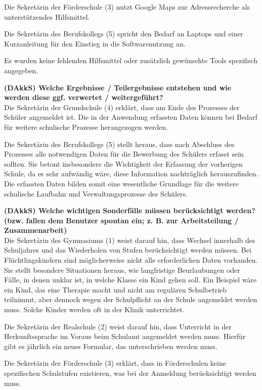 Die Sekretärin der Förderschule (3) nutzt Google Maps zur Adressrecherche als unterstützendes Hilfsmittel.

Die Sekretärin des Berufskollegs (5) spricht den Bedarf an Laptops und einer Kurzanleitung für den Einstieg in die Softwarenutzung an.

Es wurden keine fehlenden Hilfsmittel oder zusätzlich gewünschte Tools spezifisch angegeben.

\textbf{(DAkkS) Welche Ergebnisse / Teilergebnisse entstehen und wie werden diese ggf. verwertet / weitergeführt?}\\
Die Sekretärin der Grundschule (4) erklärt, dass am Ende des Prozesses der Schüler angemeldet ist. Die in der Anwendung erfassten Daten können bei Bedarf für weitere schulische Prozesse herangezogen werden.

Die Sekretärin des Berufskollegs (5) stellt heraus, dass nach Abschluss des Prozesses alle notwendigen Daten für die Bewerbung des Schülers erfasst sein sollten. Sie betont insbesondere die Wichtigkeit der Erfassung der vorherigen Schule, da es sehr aufwändig wäre, diese Information nachträglich herauszufinden. Die erfassten Daten bilden somit eine wesentliche Grundlage für die weitere schulische Laufbahn und Verwaltungsprozesse des Schülers.

\textbf{(DAkkS) Welche wichtigen Sonderfälle müssen berücksichtigt werden? (bzw. fallen dem Benutzer spontan ein; z. B. zur Arbeitsteilung / Zusammenarbeit)}\\
Die Sekretärin des Gymnasiums (1) weist darauf hin, dass Wechsel innerhalb des Schuljahres und das Wiederholen von Stufen berücksichtigt werden müssen. Bei Flüchtlingskindern sind möglicherweise nicht alle erforderlichen Daten vorhanden. Sie stellt besondere Situationen heraus, wie langfristige Beurlaubungen oder Fälle, in denen unklar ist, in welche Klasse ein Kind gehen soll. Ein Beispiel wäre ein Kind, das eine Therapie macht und nicht am regulären Schulbetrieb teilnimmt, aber dennoch wegen der Schulpflicht an der Schule angemeldet werden muss. Solche Kinder werden oft in der Klinik unterrichtet.

Die Sekretärin der Realschule (2) weist darauf hin, dass Unterricht in der Herkunftssprache im Voraus beim Schulamt angemeldet werden muss. Hierfür gibt es jährlich ein neues Formular, das unterschrieben werden muss.

Die Sekretärin der Förderschule (3) erklärt, dass in Förderschulen keine spezifischen Schulstufen existieren, was bei der Anmeldung berücksichtigt werden muss.

